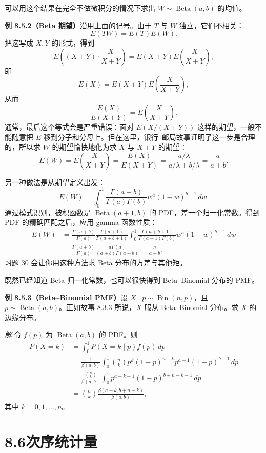 \documentclass[UTF8,12pt,a4paper,fontset=fandol]{ctexart}
\begin{document}
可以用这个结果在完全不做微积分的情况下求出 $W\sim\operatorname{Beta}(a,b)$ 的均值。

\noindent\textbf{例 8.5.2（Beta 期望）}\quad 沿用上面的记号。由于 $T$ 与 $W$ 独立，它们不相关：
\[
  E(TW)=E(T)E(W).
\]
把这写成 $X,Y$ 的形式，得到
\[
  E\left((X+Y)\cdot\frac{X}{X+Y}\right)
  =
  E(X+Y)E\left(\frac{X}{X+Y}\right),
\]
即
\[
  E(X)=E(X+Y)E\left(\frac{X}{X+Y}\right),
\]
从而
\[
  \frac{E(X)}{E(X+Y)}
  =
  E\left(\frac{X}{X+Y}\right).
\]
通常，最后这个等式会是严重错误：面对 $E(X/(X+Y))$ 这样的期望，一般不能随意把 $E$ 移到分子和分母上。但在这里，银行--邮局故事证明了这一步是合理的，所以求 $W$ 的期望愉快地化为求 $X$ 与 $X+Y$ 的期望：
\[
  E(W)=E\left(\frac{X}{X+Y}\right)
  =
  \frac{E(X)}{E(X+Y)}
  =
  \frac{a/\lambda}{a/\lambda+b/\lambda}
  =
  \frac{a}{a+b}.
\]

另一种做法是从期望定义出发：
\[
  E(W)=\int_0^1 \frac{\Gamma(a+b)}{\Gamma(a)\Gamma(b)}
  w^a(1-w)^{b-1}\,dw.
\]
通过模式识别，被积函数是 $\operatorname{Beta}(a+1,b)$ 的 PDF，差一个归一化常数。得到 PDF 的精确匹配之后，应用 gamma 函数性质：
\[
\begin{aligned}
  E(W)
  &=
  \frac{\Gamma(a+b)}{\Gamma(a)}
  \frac{\Gamma(a+1)}{\Gamma(a+b+1)}
  \int_0^1 \frac{\Gamma(a+b+1)}{\Gamma(a+1)\Gamma(b)}
  w^a(1-w)^{b-1}\,dw\\
  &=
  \frac{\Gamma(a+b)}{\Gamma(a)}
  \frac{a\Gamma(a)}{(a+b)\Gamma(a+b)}
  =
  \frac{a}{a+b}.
\end{aligned}
\]
习题 30 会让你用这种方法求 Beta 分布的方差与其他矩。

既然已经知道 Beta 归一化常数，也可以很快得到 Beta--Binomial 分布的 PMF。

\noindent\textbf{例 8.5.3（Beta--Binomial PMF）}\quad 设 $X\mid p\sim\operatorname{Bin}(n,p)$，且 $p\sim\operatorname{Beta}(a,b)$。正如故事 8.3.3 所说，$X$ 服从 Beta--Binomial 分布。求 $X$ 的边缘分布。

\noindent\textit{解.}\quad 令 $f(p)$ 为 $\operatorname{Beta}(a,b)$ 的 PDF。则
\[
\begin{aligned}
  P(X=k)
  &=\int_0^1 P(X=k\mid p)f(p)\,dp\\
  &=\frac1{\beta(a,b)}
    \int_0^1 {n\choose k}p^k(1-p)^{n-k}p^{a-1}(1-p)^{b-1}\,dp\\
  &=\frac{{n\choose k}}{\beta(a,b)}
    \int_0^1 p^{a+k-1}(1-p)^{b+n-k-1}\,dp\\
  &={n\choose k}\frac{\beta(a+k,b+n-k)}{\beta(a,b)},
\end{aligned}
\]
其中 $k=0,1,\ldots,n$。

\section*{8.6\quad 次序统计量}
\end{document}
